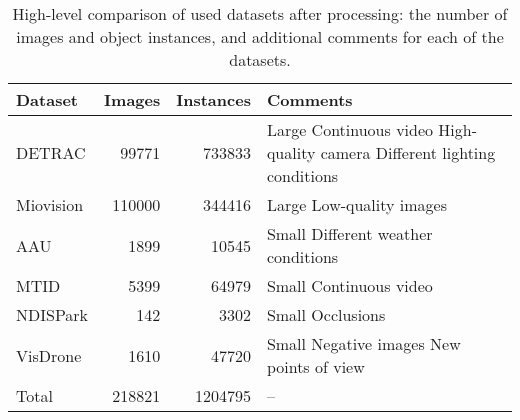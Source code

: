 \begin{table}[t]
    \centering
    \begin{threeparttable}
        \begin{tabular}{|l|rr|p{5cm}|}
            \hline
            Dataset     & Images        & Instances    & Comments \\
            \hline
            DETRAC      &  \num{99771}  & \num{733833} & Large \newline Continuous video \newline High-quality camera \newline Different lighting conditions \\
            \hline
            Miovision   &  \num{110000} & \num{344416} & Large \newline Low-quality images \\
            \hline
            AAU         &    \num{1899} &  \num{10545} & Small \newline Different weather conditions \\
            \hline
            MTID        &    \num{5399} &  \num{64979} & Small \newline Continuous video \\
            \hline
            NDISPark    &     \num{142} &   \num{3302} & Small \newline Occlusions \\
            \hline
            VisDrone    &    \num{1610} &  \num{47720} & Small \newline Negative images \newline New points of view \\
            \hline
            \hline
            Total       &  \num{218821} & \num{1204795} & -- \\
            \hline
        \end{tabular}
        \caption{High-level comparison of used datasets after processing: the number of
        images and object instances, and additional comments for each of the datasets.}
        \label{DatasetsSummary}
    \end{threeparttable}
\end{table}

